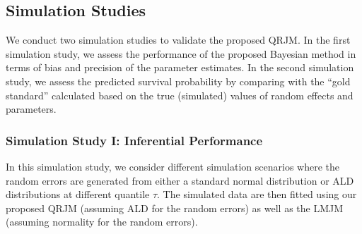 







% 

\subsection{Simulation Studies} \label{sec:simulation}
We conduct two simulation studies to validate the proposed QRJM. In the first simulation study, we assess the performance of the proposed Bayesian method in terms of bias and precision of the parameter estimates. In the second simulation study, we assess the predicted survival probability by comparing with the ``gold standard'' calculated based on the true (simulated) values of random effects and parameters.

\subsubsection{Simulation Study I: Inferential Performance }\label{sec:sim1}
In this simulation study, we consider different simulation scenarios where the random errors are generated from either a standard normal distribution or ALD distributions at different quantile $\tau$. The simulated data are then fitted using our proposed QRJM (assuming ALD for the random errors) as well as the LMJM (assuming normality for the random errors).


